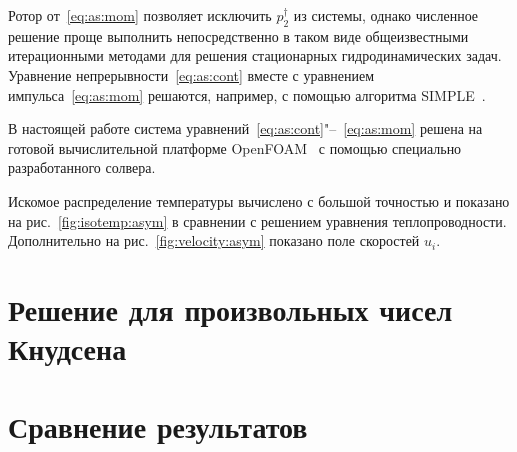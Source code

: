 \documentclass[english,russian,a4paper,12pt]{article}
\begin{document}
Ротор от~\eqref{eq:as:mom} позволяет исключить \(p_2^\dag\) из системы,
однако численное решение проще выполнить непосредственно в таком виде
общеизвестными итерационными методами для решения стационарных гидродинамических задач.
Уравнение непрерывности~\eqref{eq:as:cont} вместе с уравнением импульса~\eqref{eq:as:mom}
решаются, например, с помощью алгоритма SIMPLE~\cite{Caretto1972}.

В настоящей работе система уравнений~\eqref{eq:as:cont}"--~\eqref{eq:as:mom} решена
на готовой вычислительной платформе OpenFOAM\textregistered{}~\cite{Tabor1998}
с помощью специально разработанного солвера.

Искомое распределение температуры вычислено с большой точностью и показано
на рис.~\ref{fig:isotemp:asym} в сравнении с решением уравнения теплопроводности.
Дополнительно на рис.~\ref{fig:velocity:asym} показано поле скоростей \(u_i\).

\section{Решение для произвольных чисел Кнудсена}

\section{Сравнение результатов}



\printbibliography
\end{document}
